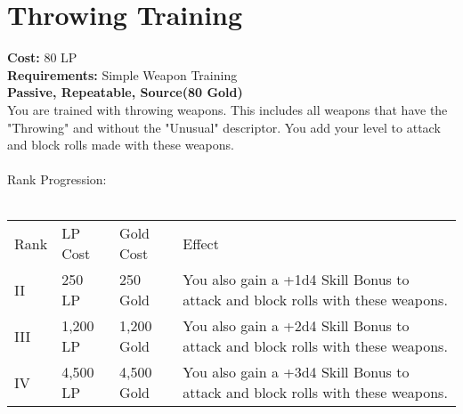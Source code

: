 \section{Throwing Training}\label{perk:throwingTraining}
\textbf{Cost:} 80 LP\\
\textbf{Requirements:} Simple Weapon Training\\
\textbf{Passive, Repeatable, Source(80 Gold)}\\
You are trained with throwing weapons.
This includes all weapons that have the "Throwing" and without the "Unusual" descriptor.
You add your level to attack and block rolls made with these weapons.\\
\\
Rank Progression:\\
\\
\begin{longtable}{l | l | l | p{9cm}}
	Rank & LP Cost & Gold Cost & Effect\\
	II & 250 LP & 250 Gold & You also gain a +1d4 Skill Bonus to attack and block rolls with these weapons.\\
	III & 1,200 LP & 1,200 Gold & You also gain a +2d4 Skill Bonus to attack and block rolls with these weapons.\\
	IV & 4,500 LP & 4,500 Gold & You also gain a +3d4 Skill Bonus to attack and block rolls with these weapons.\\
\end{longtable}
